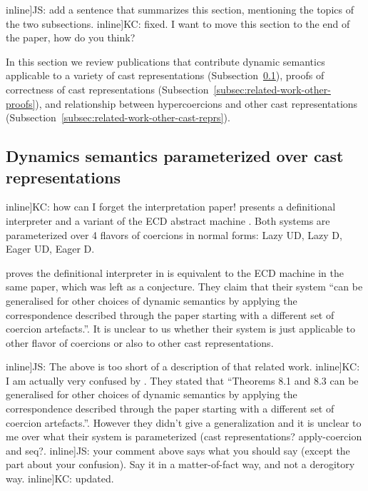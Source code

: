 \documentclass[runningheads]{llncs}
\newcommand{\todo}[1]{}
\begin{document}
\todo[inline]{JS: add a sentence that summarizes this section,
  mentioning the topics of the two subsections.}
\todo[inline]{KC: fixed. I want to move this section to the end
of the paper, how do you think?}
  
In this section we review publications that contribute dynamic semantics
applicable to a variety of cast representations
(Subsection~\ref{subsec:parameterized-dynamics}),
proofs of correctness of cast representations
(Subsection~\ref{subsec:related-work-other-proofs}),
and relationship between hypercoercions and other cast representations
(Subsection~\ref{subsec:related-work-other-cast-reprs}).

\subsection{Dynamics semantics parameterized over cast representations}
\label{subsec:parameterized-dynamics}

\todo[inline]{KC: how can I forget the interpretation paper!}
\cite{siek2012interpretations} presents a definitional interpreter
and a variant of the ECD abstract machine \citep{siek2012ECD}.
Both systems are parameterized over 4 flavors of coercions in normal
forms: Lazy UD, Lazy D, Eager UD, Eager D.

\citet{garcia2014deriving} proves the definitional interpreter
in \cite{siek2012interpretations}
is equivalent to the ECD machine in the same paper,
which was left as a conjecture. 
They claim that their system ``can be generalised for other choices
of dynamic semantics by applying the correspondence described 
through the paper starting with a different set of coercion artefacts.''.
It is unclear to us whether their system is just applicable
to other flavor of coercions or also to other cast representations.

\todo[inline]{JS: The above is too short of a description of that related
work.}
\todo[inline]{KC: I am actually very confused by \citet{garcia2014deriving}.
They stated that ``Theorems 8.1 and 8.3 can be generalised for other choices
of dynamic semantics by applying the correspondence described
through the paper starting with a different set of coercion artefacts.''.
However they didn't give a generalization and it is unclear to me over what
their system is parameterized (cast representations? apply-coercion and seq?.}
\todo[inline]{JS: your comment above says what you should say
  (except the part about your confusion). Say it in a matter-of-fact
way, and not a derogitory way.}
\todo[inline]{KC: updated.}
\end{document}
